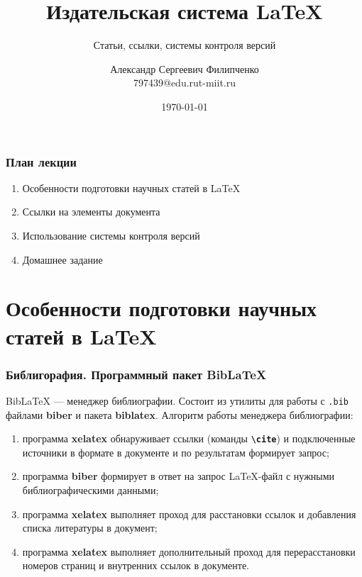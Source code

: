 \documentclass[aspectratio=169]{beamer}
\title[Заголовок]{Издательская система \LaTeX{}}
\subtitle{Статьи, ссылки, системы контроля версий}
\author[Имя автора]{Александр Сергеевич Филипченко \\ \smallskip \scriptsize 797439@edu.rut-miit.ru\\}
\institute{кафедра <<Вычислительные системы, сети и информационная безопасность>>}
\date{\today}
\begin{document}

\frame[plain]{\titlepage}	%

\begin{frame}
\frametitle{План лекции}
	\begin{enumerate} 
	\item Особенности подготовки научных статей в \LaTeX{}
	\item Ссылки на элементы документа
	\item Использование системы контроля версий
 	\item Домашнее задание
\end{enumerate} 
\end{frame}

\section{Особенности подготовки научных статей в \LaTeX{}}

\begin{frame}
\frametitle{Библигорафия. Программный пакет BibLaTeX}
BibLaTeX --- менеджер библиографии.
Состоит из утилиты для работы с \texttt{.bib} файлами \textbf{biber} и пакета \textbf{biblatex}.
Алгоритм работы менеджера библиографии:
\begin{enumerate} 
\item программа \textbf{xelatex} обнаруживает ссылки (команды \texttt{\textbf{\textbackslash cite}}) и подключенные источники в формате в документе и по результатам формирует запрос;
\item программа \textbf{biber} формирует в ответ на запрос LaTeX-файл с нужными библиографическими данными;
\item программа \textbf{xelatex} выполняет проход для расстановки ссылок и добавления списка литературы в документ;
\item программа \textbf{xelatex} выполняет дополнительный проход для перерасстановки номеров страниц и внутренних ссылок в документе.
\end{enumerate} 
\end{frame}
\end{document}
